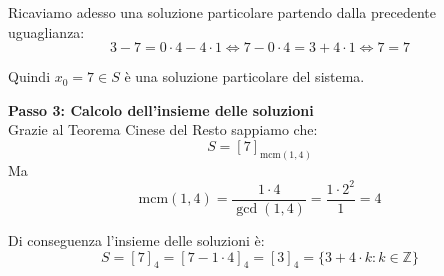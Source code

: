 \documentclass[12pt]{article}
\begin{document}
Ricaviamo adesso una soluzione particolare partendo dalla precedente uguaglianza:
$$3 - 7 = 0 \cdot 4 - 4 \cdot 1 \iff 7 - 0 \cdot 4 = 3 + 4 \cdot 1 \iff 7 = 7$$

Quindi $x_0 = 7 \in S$ è una soluzione particolare del sistema.


\textbf{Passo 3: Calcolo dell'insieme delle soluzioni} \\ 
Grazie al Teorema Cinese del Resto sappiamo che:
$$S = [7]_{\mathrm{mcm}(1, 4)}$$
Ma
$$\mathrm{mcm}({1}, {4}) = \frac{{1} \cdot {4}}{\gcd({1},{4})} = \frac{{1} \cdot {2^{2}}}{1} = {4}$$

Di conseguenza l'insieme delle soluzioni è:
        $$S = [7]_{4} = [7 - 1 \cdot 4]_{4} = [3]_{4} = \{3 + 4 \cdot k : k \in \mathbb{Z}\}$$
        
\end{document}
